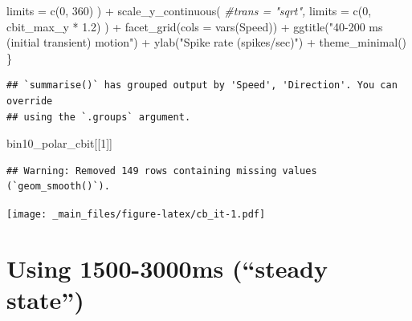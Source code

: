 \documentclass[
]{book}
\newenvironment{Shaded}{\begin{snugshade}}{\end{snugshade}}
\newcommand{\AttributeTok}[1]{\textcolor[rgb]{0.77,0.63,0.00}{#1}}
\newcommand{\CommentTok}[1]{\textcolor[rgb]{0.56,0.35,0.01}{\textit{#1}}}
\newcommand{\DecValTok}[1]{\textcolor[rgb]{0.00,0.00,0.81}{#1}}
\newcommand{\FloatTok}[1]{\textcolor[rgb]{0.00,0.00,0.81}{#1}}
\newcommand{\FunctionTok}[1]{\textcolor[rgb]{0.00,0.00,0.00}{#1}}
\newcommand{\NormalTok}[1]{#1}
\newcommand{\SpecialCharTok}[1]{\textcolor[rgb]{0.00,0.00,0.00}{#1}}
\newcommand{\StringTok}[1]{\textcolor[rgb]{0.31,0.60,0.02}{#1}}
\begin{document}
\begin{Shaded}
\begin{Highlighting}[]
      \AttributeTok{limits =} \FunctionTok{c}\NormalTok{(}\DecValTok{0}\NormalTok{, }\DecValTok{360}\NormalTok{)}
\NormalTok{    ) }\SpecialCharTok{+}
    \FunctionTok{scale\_y\_continuous}\NormalTok{(}
      \CommentTok{\#trans = "sqrt",}
      \AttributeTok{limits =} \FunctionTok{c}\NormalTok{(}\DecValTok{0}\NormalTok{, cbit\_max\_y }\SpecialCharTok{*} \FloatTok{1.2}\NormalTok{)}
\NormalTok{    ) }\SpecialCharTok{+}
    \FunctionTok{facet\_grid}\NormalTok{(}\AttributeTok{cols =} \FunctionTok{vars}\NormalTok{(Speed)) }\SpecialCharTok{+}
    \FunctionTok{ggtitle}\NormalTok{(}\StringTok{"40{-}200 ms (initial transient) motion"}\NormalTok{) }\SpecialCharTok{+}
    \FunctionTok{ylab}\NormalTok{(}\StringTok{"Spike rate (spikes/sec)"}\NormalTok{) }\SpecialCharTok{+}
    \FunctionTok{theme\_minimal}\NormalTok{()}
\NormalTok{\}}
\end{Highlighting}
\end{Shaded}

\begin{verbatim}
## `summarise()` has grouped output by 'Speed', 'Direction'. You can override
## using the `.groups` argument.
\end{verbatim}

\begin{Shaded}
\begin{Highlighting}[]
\NormalTok{bin10\_polar\_cbit[[}\DecValTok{1}\NormalTok{]]}
\end{Highlighting}
\end{Shaded}

\begin{verbatim}
## Warning: Removed 149 rows containing missing values (`geom_smooth()`).
\end{verbatim}

\texttt{[image: \_main\_files/figure-latex/cb\_it-1.pdf]}

\hypertarget{using-1500-3000ms-steady-state}{%
\section{Using 1500-3000ms (``steady state'')}\label{using-1500-3000ms-steady-state}}
\end{document}
